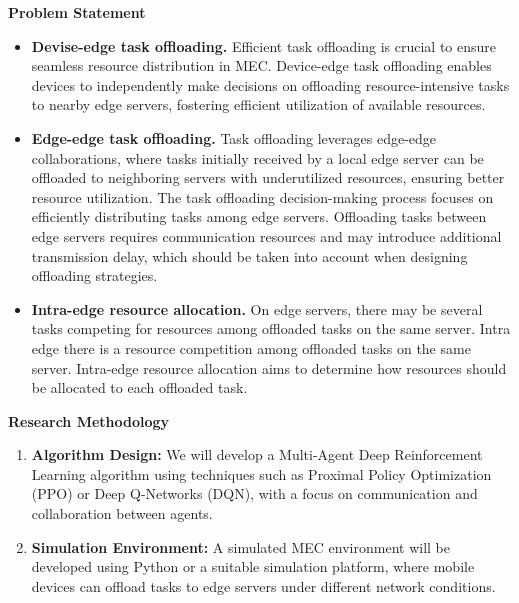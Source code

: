 \documentclass[12pt]{article}
\begin{document}
\vspace{1mm}

\noindent\textbf{\large Problem Statement}

\begin{itemize}
	
	\item \textbf{Devise-edge task offloading.}
	Efficient task offloading is crucial to ensure seamless resource distribution in MEC. Device-edge task offloading enables devices to independently make decisions on offloading resource-intensive tasks to nearby edge servers, fostering efficient utilization of available resources.
	
	\item\textbf{Edge-edge task offloading.} 
	Task offloading leverages edge-edge collaborations, where tasks initially received by a local edge server can be offloaded to neighboring servers with underutilized resources, ensuring better resource utilization. The task offloading decision-making process focuses on efficiently distributing tasks among edge servers. Offloading tasks between edge servers requires communication resources and may introduce additional transmission delay, which should be taken into account when designing offloading strategies.
	
	\item\textbf{Intra-edge resource allocation.} On edge servers, there may be several tasks competing for resources among offloaded tasks on the same server. Intra edge there is a resource competition among offloaded tasks on the same server. Intra-edge resource allocation aims to determine how resources should be allocated to each offloaded task.
	
\end{itemize}

\vspace{5mm}

\noindent\textbf{\large Research Methodology}

\begin{enumerate} \item \textbf{Algorithm Design:} We will develop a Multi-Agent Deep Reinforcement Learning algorithm using techniques such as Proximal Policy Optimization (PPO) or Deep Q-Networks (DQN), with a focus on communication and collaboration between agents. \item \textbf{Simulation Environment:} A simulated MEC environment will be developed using Python or a suitable simulation platform, where mobile devices can offload tasks to edge servers under different network conditions. 
\end{enumerate}







\end{document}

